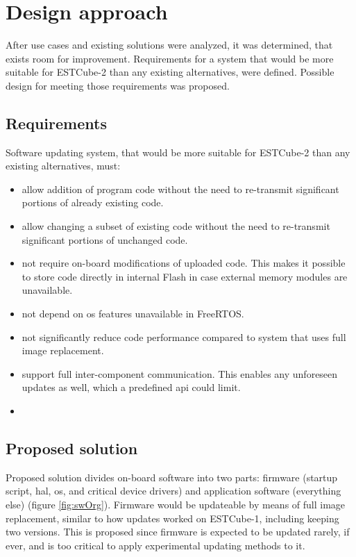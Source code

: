 \newpage
\section{Design approach}

After use cases and existing solutions were analyzed, it was determined, that exists room for improvement. Requirements for a system that would be more suitable for ESTCube-2 than any existing alternatives, were defined. Possible design for meeting those requirements was proposed.

\subsection{Requirements}

Software updating system, that would be more suitable for ESTCube-2 than any existing alternatives, must:

\begin{itemize}
	\item allow addition of program code without the need to re-transmit significant portions of already existing code.
	\item allow changing a subset of existing code without the need to re-transmit significant portions of unchanged code.
	\item not require on-board modifications of uploaded code. This makes it possible to store code directly in internal Flash in case external memory modules are unavailable. 
	\item not depend on \gls{os} features unavailable in FreeRTOS.
	\item not significantly reduce code performance compared to system that uses full image replacement.
	\item support full inter-component communication. This enables any unforeseen updates as well, which a predefined \gls{api} could limit.
	\item {}
\end{itemize}

\subsection{Proposed solution}

Proposed solution divides on-board software into two parts: firmware (startup script, \gls{hal}, \gls{os}, and critical device drivers) and application software (everything else) (figure \ref{fig:swOrg}). Firmware would be updateable by means of full image replacement, similar to how updates worked on ESTCube-1, including keeping two versions. This is proposed since firmware is expected to be updated rarely, if ever, and is too critical to apply experimental updating methods to it. 

